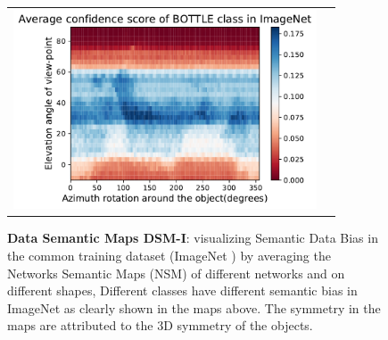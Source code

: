 \begin{figure}[h]
\begin{tabular}{c|c}
\includegraphics[width = 9cm]{supimages/bias/bottle_Average_2D.pdf}
\end{tabular}
   \caption{\small \textbf{Data Semantic Maps DSM-I}: visualizing Semantic Data Bias in the common training dataset (\ie ImageNet \cite{IMAGENET}) by averaging the Networks Semantic Maps (NSM) of different networks and on different shapes, Different classes have different semantic bias in ImageNet as clearly shown in the maps above. The symmetry in the maps are attributed to the 3D symmetry of the objects. }
   \vspace{-8pt}
   \label{fig:dsm1}
\end{figure}

